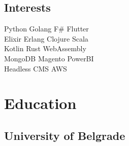 \documentclass[letterpaper]{deedy-resume} %
\begin{document}
\begin{minipage}[t]{0.33\textwidth}
\sectionspace %

\subsection{Interests}

Python \textbullet{} Golang \textbullet{} F\# \textbullet{} Flutter\\ 
Elixir \textbullet{} Erlang \textbullet{} Clojure \textbullet{} Scala\\
Kotlin \textbullet{} Rust \textbullet{} WebAssembly\\
MongoDB \textbullet{} Magento \textbullet{} PowerBI\\
Headless CMS \textbullet{} AWS

\sectionspace %


\section{Education} 

\subsection{University of Belgrade}


\sectionspace %


\sectionspace %


\end{minipage} %
\hfill
%
%
\end{document}
